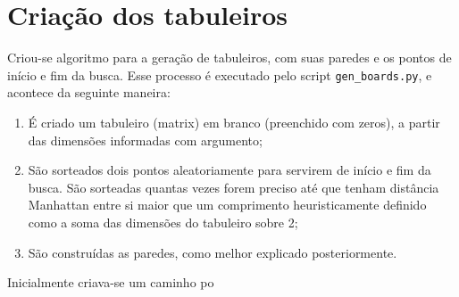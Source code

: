 \documentclass{article}
\begin{document}
\section{Criação dos tabuleiros}
Criou-se algoritmo para a geração de tabuleiros, com suas paredes e os pontos de início e fim da busca. Esse processo é executado pelo script \texttt{gen\_boards.py}, e acontece da seguinte maneira:

\begin{enumerate}
	\item É criado um tabuleiro (matrix) em branco (preenchido com zeros), a partir das dimensões informadas com argumento;
	\item São sorteados dois pontos aleatoriamente para servirem de início e fim da busca. São sorteadas quantas vezes forem preciso até que tenham distância Manhattan entre si maior que um comprimento heuristicamente definido como a soma das dimensões do tabuleiro sobre 2;
	\item São construídas as paredes, como melhor explicado posteriormente.
\end{enumerate}

Inicialmente criava-se um caminho po
\end{document}
